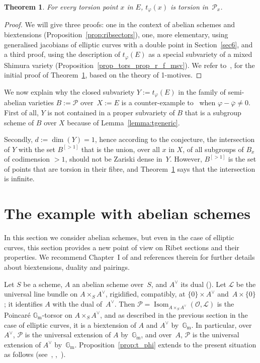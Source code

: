 \documentclass[11pt]{article}
\providecommand{\G}{}
\let\mathcal\mathscr
\let\oldvee\vee
\renewcommand{\vee}{{\scriptscriptstyle\oldvee}}
\theoremstyle{plain}
\newtheorem{Theorem}[subsection]{Theorem}
\theoremstyle{definition}
\numberwithin{equation}{subsection}
\let\ol\overline
\let\phi\varphi
\renewcommand{\G}{\mathbb G}
\newcommand{\calL}{\mathcal{L}}
\newcommand{\calO}{\mathcal{O}}
\newcommand{\calP}{\mathcal{P}}
\newcommand{\Gm}{\G_{\mathrm{m}}}
\DeclareMathOperator{\Isom}{Isom}
\begin{document}
\begin{Theorem}\label{thm:ttorsionproperty}
For every torsion point $x$ in $E$, $t_\phi(x)$ is torsion in~$\calP_x$.
\end{Theorem}
\begin{proof}
We will give three proofs: one in the context of abelian schemes and
biextensions (Proposition~\ref{prop:ribsectors}), one, more
elementary, using generalised jacobians of elliptic curves with a
double point in Section~\ref{sec6}, and a third proof, using the
description of $t_\phi(E)$ as a special subvariety of a mixed
Shimura variety (Proposition~\ref{prop_tors_prop_r_f_msv}).
We refer to~\cite[\S 1]{Bertrand11}, for the initial proof of
Theorem~\ref{thm:ttorsionproperty}, based on the theory of 1-motives.
\end{proof}
We now explain why the closed subvariety
$Y:=t_\phi(E)$ in the family of semi-abelian varieties $B:=\calP$
over~$X:=E$ is a counter-example to~\cite[Conj.\,6.1]{Pink2} when
$\phi-\ol{\phi}\neq 0$.
First of all, $Y$ is not contained in a proper subvariety of $B$ that
is a subgroup scheme of $B$ over $X$ because of
Lemma~\ref{lemma:tgeneric}.

Secondly, $d:=\dim(Y)=1$, hence according to the conjecture, the
intersection of $Y$ with the set $B^{[>1]}$ that is the union, over
all $x$ in $X$, of all subgroups of $B_x$ of codimension $>1$, should
not be Zariski dense in~$Y$. However, $B^{[>1]}$ is the set of points
that are torsion in their fibre, and
Theorem~\ref{thm:ttorsionproperty} says that the intersection is
infinite.

\section{The example with abelian schemes}\label{sec3}

In this section we consider abelian schemes, but even in the case of
elliptic curves, this section provides a new point of view on
Ribet sections and their properties. We recommend Chapter~I of
\cite{Moret-Bailly} and references therein for further details about
biextensions, duality and pairings.

Let $S$ be a scheme, $A$ an abelian scheme over~$S$, and $A^\vee$ its
dual (\cite[\S I.1]{Faltings-Chai}). Let $\calL$ be the
universal line bundle on $A\times_S A^\vee$, rigidified, compatibly,
at $\{0\}\times A^\vee$ and~$A\times\{0\}$; it identifies $A$ with the
dual of~$A^\vee$. Then $\calP=\Isom_{A\times_S A^\vee}(\calO,\calL)$
is the Poincaré $\Gm$-torsor on $A\times_S A^\vee$, and as described
in the previous section in the case of elliptic curves, it is a
biextension of $A$ and $A^\vee$ by~$\Gm$. In particular,
over~$A^\vee$, $\calP$ is the universal extension of $A$ by~$\Gm$, and
over~$A$, $\calP$ is the universal extension of $A^\vee$
by~$\Gm$. Proposition~\ref{prop:t_phi} extends to the present
situation as follows (see~\cite{Breen}, \hbox{\cite{Chambert-Loir99},
\cite[\S 8.3]{Lopuhaa}}).
\end{document}
